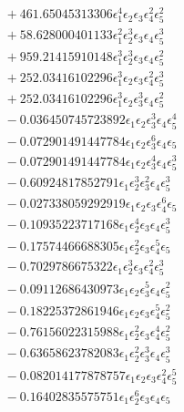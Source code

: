 \documentclass[10pt]{article}
\begin{document}
\begin{align*}
&{}  + 461.65045313306 \epsilon_{1}^{4} \epsilon_{2} \epsilon_{3} \epsilon_{4}^{2} \epsilon_{5}^{2} \\
&{}  + 58.628000401133 \epsilon_{1}^{2} \epsilon_{2}^{3} \epsilon_{3} \epsilon_{4} \epsilon_{5}^{3} \\
&{}  + 959.21415910148 \epsilon_{1}^{3} \epsilon_{2}^{3} \epsilon_{3} \epsilon_{4} \epsilon_{5}^{2} \\
&{}  + 252.03416102296 \epsilon_{1}^{3} \epsilon_{2} \epsilon_{3} \epsilon_{4}^{2} \epsilon_{5}^{3} \\
&{}  + 252.03416102296 \epsilon_{1}^{3} \epsilon_{2} \epsilon_{3}^{3} \epsilon_{4} \epsilon_{5}^{2} \\
&{}  - 0.036450745723892 \epsilon_{1} \epsilon_{2} \epsilon_{3}^{3} \epsilon_{4} \epsilon_{5}^{4} \\
&{}  - 0.072901491447784 \epsilon_{1} \epsilon_{2} \epsilon_{3}^{6} \epsilon_{4} \epsilon_{5} \\
&{}  - 0.072901491447784 \epsilon_{1} \epsilon_{2} \epsilon_{3}^{4} \epsilon_{4} \epsilon_{5}^{3} \\
&{}  - 0.60924817852791 \epsilon_{1} \epsilon_{2}^{3} \epsilon_{3}^{2} \epsilon_{4} \epsilon_{5}^{3} \\
&{}  - 0.027338059292919 \epsilon_{1} \epsilon_{2} \epsilon_{3} \epsilon_{4}^{6} \epsilon_{5} \\
&{}  - 0.10935223717168 \epsilon_{1} \epsilon_{2}^{4} \epsilon_{3} \epsilon_{4} \epsilon_{5}^{3} \\
&{}  - 0.17574466688305 \epsilon_{1} \epsilon_{2}^{2} \epsilon_{3} \epsilon_{4}^{5} \epsilon_{5} \\
&{}  - 0.7029786675322 \epsilon_{1} \epsilon_{2}^{3} \epsilon_{3} \epsilon_{4}^{2} \epsilon_{5}^{3} \\
&{}  - 0.09112686430973 \epsilon_{1} \epsilon_{2} \epsilon_{3}^{5} \epsilon_{4} \epsilon_{5}^{2} \\
&{}  - 0.18225372861946 \epsilon_{1} \epsilon_{2} \epsilon_{3} \epsilon_{4}^{5} \epsilon_{5}^{2} \\
&{}  - 0.76156022315988 \epsilon_{1} \epsilon_{2}^{2} \epsilon_{3} \epsilon_{4}^{4} \epsilon_{5}^{2} \\
&{}  - 0.63658623782083 \epsilon_{1} \epsilon_{2}^{2} \epsilon_{3}^{3} \epsilon_{4} \epsilon_{5}^{3} \\
&{}  - 0.082014177878757 \epsilon_{1} \epsilon_{2} \epsilon_{3} \epsilon_{4}^{2} \epsilon_{5}^{5} \\
&{}  - 0.16402835575751 \epsilon_{1} \epsilon_{2}^{6} \epsilon_{3} \epsilon_{4} \epsilon_{5} \\

\end{align*}
\end{document}

